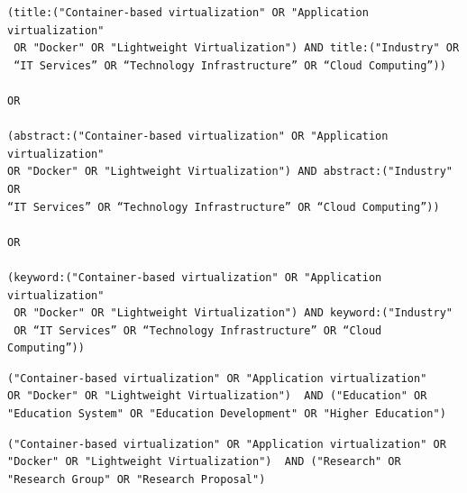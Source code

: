 \begin{tcolorbox}[
		colback=gray!5,
		colframe=black!60,
		title=Cadena de búsqueda en Springer para extensión,
		fonttitle=\bfseries,
		sharp corners=south
	]
	\scriptsize %
	\begin{verbatim}
(title:("Container-based virtualization" OR "Application virtualization"
 OR "Docker" OR "Lightweight Virtualization") AND title:("Industry" OR 
 “IT Services” OR “Technology Infrastructure” OR “Cloud Computing”))

OR

(abstract:("Container-based virtualization" OR "Application virtualization" 
OR "Docker" OR "Lightweight Virtualization") AND abstract:("Industry" OR 
“IT Services” OR “Technology Infrastructure” OR “Cloud Computing”))

OR 

(keyword:("Container-based virtualization" OR "Application virtualization"
 OR "Docker" OR "Lightweight Virtualization") AND keyword:("Industry" 
 OR “IT Services” OR “Technology Infrastructure” OR “Cloud Computing”))

\end{verbatim}
\end{tcolorbox}

\begin{tcolorbox}[
		colback=gray!5,
		colframe=black!60,
		title=Cadena de búsqueda en Science Direct para educación,
		fonttitle=\bfseries,
		sharp corners=south
	]
	\scriptsize %
	\begin{verbatim}
("Container-based virtualization" OR "Application virtualization" 
OR "Docker" OR "Lightweight Virtualization")  AND ("Education" OR 
"Education System" OR "Education Development" OR "Higher Education")
\end{verbatim}
\end{tcolorbox}


\begin{tcolorbox}[
		colback=gray!5,
		colframe=black!60,
		title=Cadena de búsqueda en Science Direct para investigación,
		fonttitle=\bfseries,
		sharp corners=south
	]
	\scriptsize %
	\begin{verbatim}
("Container-based virtualization" OR "Application virtualization" OR 
"Docker" OR "Lightweight Virtualization")  AND ("Research" OR 
"Research Group" OR "Research Proposal")
\end{verbatim}
\end{tcolorbox}

